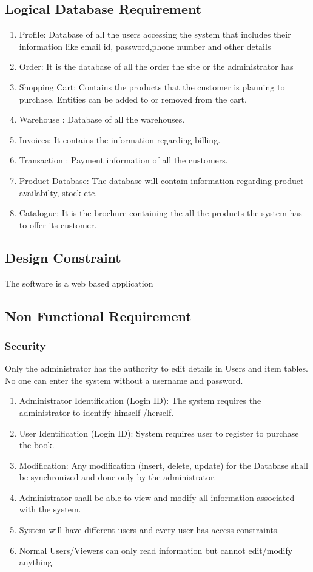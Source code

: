 \documentclass{article}
\begin{document}
\subsection{Logical Database Requirement}
\begin{enumerate}
\item Profile: Database of all the users accessing the system that includes their information like email id, password,phone number and other details
\item Order: It is the database of all the order the  site or the administrator has 
\item Shopping Cart: Contains the products that the customer is planning to purchase. Entities can be added to or removed from the cart.
\item Warehouse : Database of all the warehouses.
\item Invoices: It contains the information regarding billing.
\item Transaction : Payment information of all the customers.
\item Product Database: The database will contain information regarding product availabilty, stock  etc.
\item Catalogue: It is the brochure containing the all the products the system has to offer its customer.
\end{enumerate}
\subsection{Design Constraint} 
The software is a web based application
\subsection{Non Functional Requirement}
\subsubsection{Security}
Only the administrator has the authority to edit details in Users and
item tables. No one can enter the system without a username and
password.
\begin{enumerate}
\item Administrator Identification (Login ID): The system requires the administrator  to
identify himself /herself.
\item User Identification (Login ID): System requires user to register
to purchase the book.
\item Modification: Any modification (insert, delete, update) for the
Database shall be synchronized and done only by the
administrator.
\item Administrator  shall be able to view and modify all information associated with the system.
\item System will have different users and every user has access
constraints.
\item Normal Users/Viewers can only read information but cannot
       edit/modify anything.
\end{enumerate}
\end{document}
